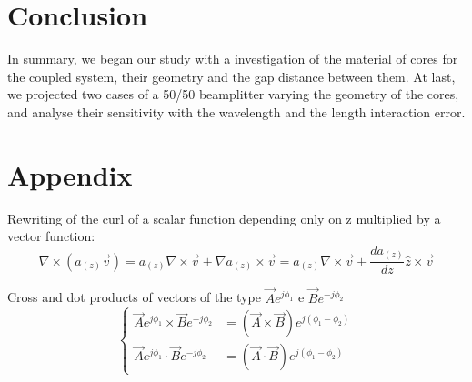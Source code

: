 \documentclass[conference, a4paper]{IEEEtran}
\begin{document}
\section{Conclusion}
\label{sec:conclusion}

In summary, we began our study with a investigation of the material of cores for the coupled system, their geometry and the gap distance between them. At last, we projected two cases of a 50/50 beamplitter varying the geometry of the cores, and analyse their sensitivity with the wavelength and the length interaction error.

\section*{Appendix}
\label{sec:appendix}

Rewriting of the curl of a scalar function depending only on z multiplied by a vector function:
\begin{equation}\label{eq:rot_av}
\nabla\times\left(a_{(z)}\vec{v}\right) = a_{(z)}\nabla\times\vec{v} + \nabla a_{(z)}\times\vec{v} = a_{(z)}\nabla\times\vec{v} + \frac{da_{(z)}}{dz}\hat{z}\times\vec{v}
\end{equation}

Cross and dot products of vectors of the type $\vec{A}e^{j\phi_1}$ e $\vec{B}e^{-j\phi_2}$
\begin{equation} \label{eq:cross_dot_identity}
\left\{
\begin{split}
\vec{A}e^{j\phi_1}\times \vec{B}e^{-j\phi_2} &= (\vec{A}\times\vec{B})e^{j(\phi_1-\phi_2)} \\
\vec{A}e^{j\phi_1}\cdot \vec{B}e^{-j\phi_2} &= (\vec{A}\cdot\vec{B})e^{j(\phi_1-\phi_2)}
\end{split}
\right.
\end{equation}

% 
% 

\end{document}
